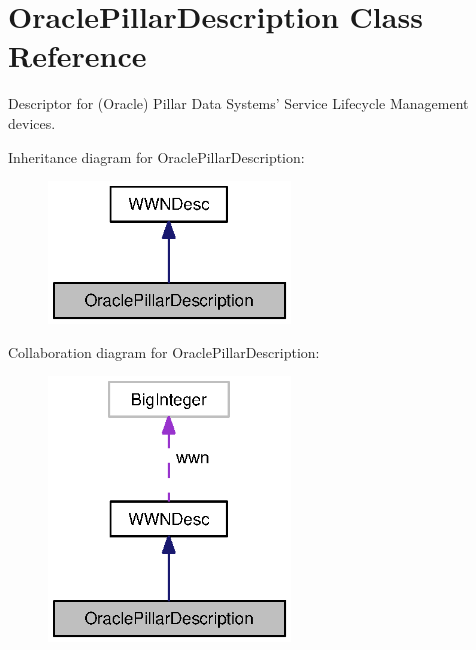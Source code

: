 \section{Oracle\-Pillar\-Description Class Reference}
\label{classorg_1_1smallfoot_1_1wwn_1_1OraclePillarDescription}


Descriptor for (Oracle) Pillar Data Systems' Service Lifecycle Management devices.  




Inheritance diagram for Oracle\-Pillar\-Description\-:\nopagebreak
\begin{figure}[H]
\begin{center}
\leavevmode
\includegraphics[width=182pt]{classorg_1_1smallfoot_1_1wwn_1_1OraclePillarDescription__inherit__graph}
\end{center}
\end{figure}


Collaboration diagram for Oracle\-Pillar\-Description\-:\nopagebreak
\begin{figure}[H]
\begin{center}
\leavevmode
\includegraphics[width=182pt]{classorg_1_1smallfoot_1_1wwn_1_1OraclePillarDescription__coll__graph}
\end{center}
\end{figure}
